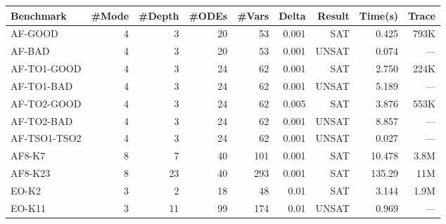 
\newcommand{\hmodel}[2]{\href{http://dreal.cs.cmu.edu/#1}{#2}}
{\small
\begin{table}[!th]
  \centering
  \small
  \begin{tabular}{l|r|r|r|r|r|r|r|r}
    \hline
    \hline
    Benchmark    & \#Mode& \#Depth & \#ODEs & \#Vars  & Delta  & Result       & Time(s) & Trace \\
    \hline
    \hline
      AF-GOOD & 4     & 3        & 20     & 53      & 0.001     & SAT &  0.425    & 793K     \\
       AF-BAD & 4     & 3        & 20     & 53      & 0.001     & UNSAT &  0.074    & ---      \\
  AF-TO1-GOOD & 4     & 3        & 24     & 62      & 0.001     & SAT &  2.750    & 224K     \\
   AF-TO1-BAD & 4     & 3        & 24     & 62      & 0.001     & UNSAT &  5.189    & ---     \\
  AF-TO2-GOOD & 4     & 3        & 24     & 62      & 0.005     & SAT &  3.876    & 553K     \\
   AF-TO2-BAD & 4     & 3        & 24     & 62      & 0.001     & UNSAT &  8.857    & ---     \\
 AF-TSO1-TSO2 & 4     & 3        & 24     & 62      & 0.001     & UNSAT &  0.027    & ---     \\
       AF8-K7 & 8     & 7        & 40     & 101     & 0.001     & SAT & 10.478   & 3.8M      \\
      AF8-K23 & 8     & 23       & 40     & 293     & 0.001     & SAT & 135.29   & 11M      \\
    \hline
    \hline
    EO-K2  & 3     & 2        & 18     & 48      & 0.01    & SAT & 3.144    & 1.9M      \\
    EO-K11 & 3     & 11       & 99     & 174     & 0.01    & UNSAT & 0.969    & ---       \\

\end{tabular}
\end{table}}
